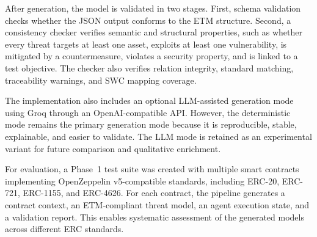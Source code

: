 After generation, the model is validated in two stages. First, schema validation checks whether the JSON output conforms to the ETM structure. Second, a consistency checker verifies semantic and structural properties, such as whether every threat targets at least one asset, exploits at least one vulnerability, is mitigated by a countermeasure, violates a security property, and is linked to a test objective. The checker also verifies relation integrity, standard matching, traceability warnings, and SWC mapping coverage.

The implementation also includes an optional LLM-assisted generation mode using Groq through an OpenAI-compatible API. However, the deterministic mode remains the primary generation mode because it is reproducible, stable, explainable, and easier to validate. The LLM mode is retained as an experimental variant for future comparison and qualitative enrichment.

For evaluation, a Phase~1 test suite was created with multiple smart contracts implementing OpenZeppelin v5-compatible standards, including ERC-20, ERC-721, ERC-1155, and ERC-4626. For each contract, the pipeline generates a contract context, an ETM-compliant threat model, an agent execution state, and a validation report. This enables systematic assessment of the generated models across different ERC standards.
